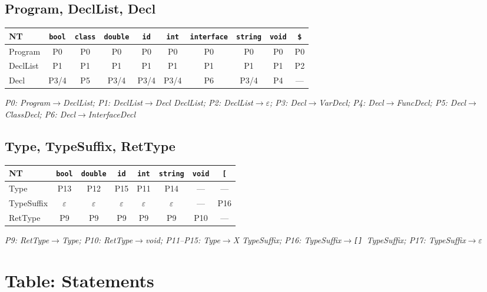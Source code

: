 \documentclass[12pt,a4paper]{article}
\begin{document}
\subsection{Program, DeclList, Decl}

\begin{center}
\begin{tabular}{l|ccccccccc}
\toprule
NT & \texttt{bool} & \texttt{class} & \texttt{double} & \texttt{id} & \texttt{int} & \texttt{interface} & \texttt{string} & \texttt{void} & \texttt{\$} \\
\midrule
Program   & P0 & P0 & P0 & P0 & P0 & P0 & P0 & P0 & P0 \\
DeclList  & P1 & P1 & P1 & P1 & P1 & P1 & P1 & P1 & P2 \\
Decl      & P3/4 & P5 & P3/4 & P3/4 & P3/4 & P6 & P3/4 & P4 & — \\
\bottomrule
\end{tabular}
\end{center}

\textit{P0: Program$\to$DeclList; P1: DeclList$\to$Decl DeclList; P2: DeclList$\to\varepsilon$;
P3: Decl$\to$VarDecl; P4: Decl$\to$FuncDecl; P5: Decl$\to$ClassDecl;
P6: Decl$\to$InterfaceDecl}

\subsection{Type, TypeSuffix, RetType}

\begin{center}
\begin{tabular}{l|ccccccc}
\toprule
NT & \texttt{bool} & \texttt{double} & \texttt{id} & \texttt{int} & \texttt{string} & \texttt{void} & \texttt{[} \\
\midrule
Type       & P13 & P12 & P15 & P11 & P14 & — & — \\
TypeSuffix & $\varepsilon$ & $\varepsilon$ & $\varepsilon$ & $\varepsilon$ & $\varepsilon$ & — & P16 \\
RetType    & P9  & P9  & P9  & P9  & P9  & P10 & — \\
\bottomrule
\end{tabular}
\end{center}

\textit{P9: RetType$\to$Type; P10: RetType$\to$void; P11--P15: Type$\to$X TypeSuffix;
P16: TypeSuffix$\to$\texttt{[]\,}TypeSuffix; P17: TypeSuffix$\to\varepsilon$}

\section{Table: Statements}
\end{document}
